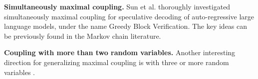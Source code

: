 \documentclass{article}
\begin{document}
\textbf{Simultaneously maximal coupling.}
Sun et al. \cite{sun2024blockverificationacceleratesspeculative_v2}
thoroughly investigated simultaneously maximal coupling for speculative decoding
of auto-regres\-sive large language models,
under the name Greedy Block Verification.
The key ideas can be previously found in the Markov chain literature.

\textbf{Coupling with more than two random variables.}
Another interesting direction for generalizing maximal coupling
is with three or more random variables \cite{angel2021pairwiseoptimalcouplingmultiple}.

\printbibliography
\end{document}
